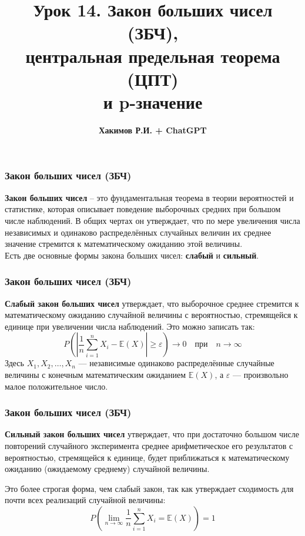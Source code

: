 \documentclass[aspectratio=169]{beamer}
\title{\bf Урок 14. Закон больших чисел (ЗБЧ),\\ центральная предельная теорема (ЦПТ)\\ и p-значение}
\author{{\bf Хакимов Р.И. + ChatGPT}}
\date[\today]{}
\begin{document}
\begin{frame}
\titlepage
\end{frame}

\begin{frame}
\frametitle{Закон больших чисел (ЗБЧ)}
{\bf Закон больших чисел} -- это фундаментальная теорема в теории вероятностей и статистике, которая описывает поведение выборочных средних при большом числе наблюдений. В общих чертах он утверждает, что по мере увеличения числа независимых и одинаково распределённых случайных величин их среднее значение стремится к математическому ожиданию этой величины.
\newline\\
Есть две основные формы закона больших чисел: {\bf слабый} и {\bf сильный}.
\end{frame}

\begin{frame}
\frametitle{Закон больших чисел (ЗБЧ)}
{\bf Слабый закон больших чисел} утверждает, что выборочное среднее стремится к математическому ожиданию случайной величины с вероятностью, стремящейся к единице при увеличении числа наблюдений. Это можно записать так:
\[
P\left(\left|\frac{1}{n}\sum_{i=1}^n X_i - \mathbb{E}(X)\right| \geq \varepsilon \right) \to 0 \quad \text{при} \quad n \to \infty
\]
Здесь \( X_1, X_2, \dots, X_n \) — независимые одинаково распределённые случайные величины с конечным математическим ожиданием \( \mathbb{E}(X) \), а \( \varepsilon \) — произвольно малое положительное число.
\end{frame}

\begin{frame}
\frametitle{Закон больших чисел (ЗБЧ)}
{\bf Сильный закон больших чисел} утверждает, что при достаточно большом числе повторений случайного эксперимента среднее арифметическое его результатов с вероятностью, стремящейся к единице, будет приближаться к математическому ожиданию (ожидаемому среднему) случайной величины.

Это более строгая форма, чем слабый закон, так как утверждает сходимость для почти всех реализаций случайной величины:
\[
P\left( \lim_{n \to \infty} \frac{1}{n}\sum_{i=1}^n X_i = \mathbb{E}(X) \right) = 1
\]
\end{frame}
\end{document}
